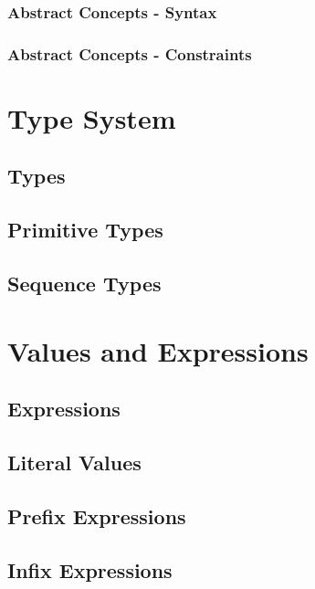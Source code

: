 \documentclass[a4paper,oneside,12pt, extrafontsizes]{memoir}
\theoremstyle{definition}
\theoremstyle{definition}
\theoremstyle{definition}
\theoremstyle{definition}
\begin{document}
\section{Abstract Concepts - Syntax}


\section{Abstract Concepts - Constraints}


\part{Type System}

\chapter{Types}

\chapter{Primitive Types}
\label{ch:primitive-types}


\chapter{Sequence Types}
\label{ch:sequence-types}

\part{Values and Expressions}

\chapter{Expressions}
\label{ch:expressions}


\chapter{Literal Values}
\label{ch:literals}

\chapter{Prefix Expressions}
\label{ch:prefix}

\chapter{Infix Expressions}
\label{ch:infix}
\end{document}
